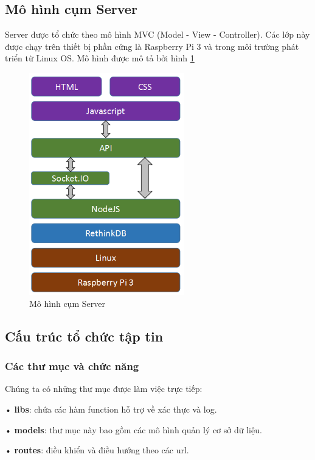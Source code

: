 \subsection{Mô hình cụm Server }
Server được tổ chức theo mô hình MVC (Model - View - Controller). Các lớp này được chạy trên thiết bị phần cứng là Raspberry Pi 3 và trong môi trường phát triển từ Linux OS. Mô hình được mô tả bởi hình \ref{fig: strucserver}

\begin{figure}[H]
	\centering    
	\includegraphics[width=0.6\textwidth]{strucserver}
	\caption[Mô hình cụm Server]{Mô hình cụm Server}
	\label{fig: strucserver}
\end{figure}

\subsection{Cấu trúc tổ chức tập tin}
\subsubsection*{Các thư mục và chức năng}
Chúng ta có những thư mục được làm việc trực tiếp:

• \textbf{libs}: chứa các hàm function hỗ trợ về xác thực và log.

• \textbf{models}: thư mục này bao gồm các mô hình quản lý cơ sở dữ liệu.

• \textbf{routes}: điều khiển và điều hướng theo các url.

